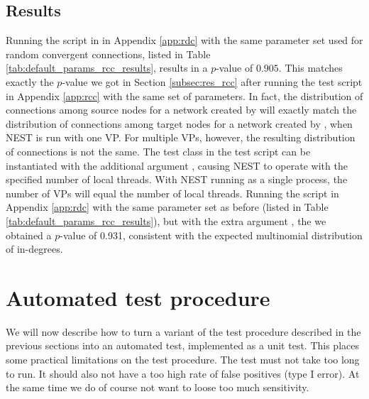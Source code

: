 \subsection{Results\label{subsec:res_rdc}}

\graphicspath{{figs/nonspatial/RDC_results/}}

Running the script in in Appendix \ref{app:rdc} with the same parameter set used for random convergent connections, listed in Table \ref{tab:default_params_rcc_results}, results in a $p$-value of $0.905$. This matches exactly the $p$-value we got in Section \ref{subsec:res_rcc} after running the test script in Appendix \ref{app:rcc} with the same set of parameters. In fact, the distribution of connections among source nodes for a network created by  will exactly match the distribution \linebreak of connections among target nodes for a network created by \linebreak{}, when NEST is run with one VP. For multiple VPs, however, the resulting distribution of connections is not the same. The test class in the test script can be instantiated with the additional argument , causing NEST to operate with the specified number of local threads. With NEST running as a single process, the number of VPs will equal the number of local threads. Running the script in Appendix \ref{app:rdc} with the same parameter set as before (listed in Table \ref{tab:default_params_rcc_results}), but with the extra argument , the we obtained a $p$-value of 0.931, consistent with the expected multinomial distribution of in-degrees.

\graphicspath{{figs/nonspatial/}}



\section{Automated test procedure\label{sec:auto}}

We will now describe how to turn a variant of the test procedure described in the previous sections into an automated test, implemented as a unit test. This places some practical limitations on the test procedure. The test must not take too long to run. It should also not have a too high rate of false positives (type I error). At the same time we do of course not want to loose too much sensitivity. 

